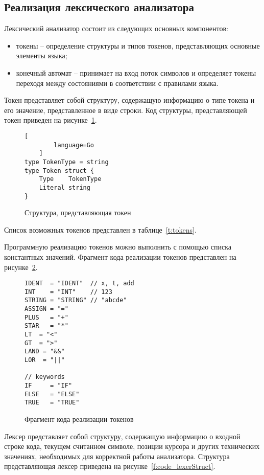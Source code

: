 \subsection{Реализация лексического анализатора}

Лексический анализатор состоит из следующих основных компонентов:
\begin{itemize}
    \item токены -- определение структуры и типов токенов, представляющих основные элементы языка;
    \item конечный автомат -- принимает на вход поток символов и определяет токены переходя между состояниями в соответствии с правилами языка.
\end{itemize}

Токен представляет собой структуру, содержащую информацию о типе токена и его значение, представленное в виде строки.
Код структуры, представляющей токен приведен на рисунке~\ref{f:code_tokenStruct}.

\begin{figure}[ht]
	\centering
	\vspace{\toppaddingoffigure}
	\begin{lstlisting}[
        language=Go
    ]
type TokenType = string
type Token struct {
    Type    TokenType
    Literal string
}        
\end{lstlisting}
	\caption{Структура, представляющая токен}
	\label{f:code_tokenStruct}
\end{figure}

Список возможных токенов представлен в таблице~\ref{t:tokens}.

Программную реализацию токенов можно выполнить с помощью списка константных значений.
Фрагмент кода реализации токенов представлен на рисунке~\ref{f:code_tokensFragemnt}.

\begin{figure}[ht]
	\centering
	\begin{lstlisting}
IDENT  = "IDENT"  // x, t, add
INT    = "INT"    // 123
STRING = "STRING" // "abcde"
ASSIGN = "="
PLUS   = "+"
STAR   = "*"
LT  = "<"
GT  = ">"
LAND = "&&"
LOR  = "||"

// keywords
IF     = "IF"
ELSE   = "ELSE"
TRUE   = "TRUE"    
\end{lstlisting}
	\caption{Фрагмент кода реализации токенов}
	\label{f:code_tokensFragemnt}
\end{figure}

Лексер представляет собой структуру, содержащую информацию о входной строке кода,
текущем считанном символе, позиции курсора и других технических значениях, необходимых для корректной работы анализатора.
Структура представляющая лексер приведена на рисунке~\ref{f:code_lexerStruct}.

